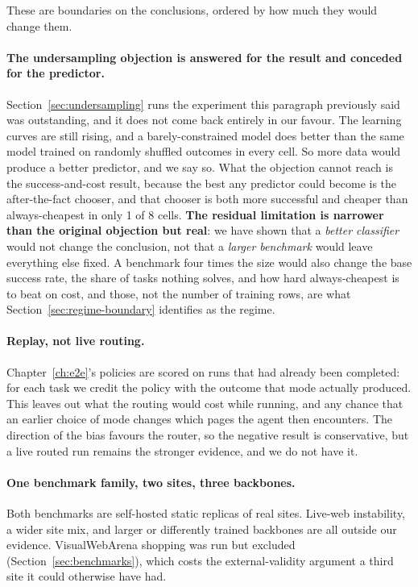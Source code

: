 These are boundaries on the conclusions, ordered by how much they would change
them.

\paragraph{The undersampling objection is answered for the result and conceded
for the predictor.} Section~\ref{sec:undersampling} runs the experiment this
paragraph previously said was outstanding, and it does not come back entirely in
our favour. The learning curves are still rising, and a barely-constrained
model does better than the same model trained on randomly shuffled outcomes in
every cell. So more data would produce a better predictor, and we say so. What
the objection cannot reach is the success-and-cost result, because the best
any predictor could become is the after-the-fact chooser, and that chooser is
both more successful and cheaper than always-cheapest in only 1 of 8 cells. \textbf{The residual limitation is
narrower than the original objection but real}: we have shown that a
\emph{better classifier} would not change the conclusion, not that a
\emph{larger benchmark} would leave everything else fixed. A benchmark four
times the size would also change the base success rate, the share of tasks
nothing solves, and how hard always-cheapest is to beat on cost, and those,
not the number of training rows, are what Section~\ref{sec:regime-boundary}
identifies as the regime.

\paragraph{Replay, not live routing.} Chapter~\ref{ch:e2e}'s policies are
scored on runs that had already been completed: for each task we credit the
policy with the outcome that mode actually produced. This leaves out what the
routing would cost while running, and any chance that an earlier choice of
mode changes which pages the agent then encounters. The direction of the bias
favours the router, so the negative result is conservative, but a live routed run remains the stronger evidence, and we do not have it.

\paragraph{One benchmark family, two sites, three backbones.} Both benchmarks
are self-hosted static replicas of real sites. Live-web instability, a wider
site mix, and larger or differently trained backbones are all outside our
evidence. VisualWebArena shopping was run but excluded
(Section~\ref{sec:benchmarks}), which costs the external-validity argument a
third site it could otherwise have had.

